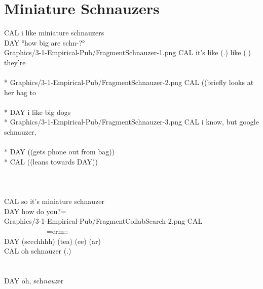 \section{Miniature Schnauzers}\label{app:fragments-pub schnauzers}
\begin{inlinefrag*} 
    \begin{transcript*}
        \by CAL {i like miniature schnauzers} \\
        \by DAY {°how big are schn-?°} \\
           {Graphics/3-1-Empirical-Pub/FragmentSchnauzer-1.png}
        \by CAL {it's like (.) like (.) they're} \\
         \\*
           {Graphics/3-1-Empirical-Pub/FragmentSchnauzer-2.png}
        \by CAL {((briefly looks at her bag to} \\
         \\*
        \by DAY {i like big dogs\vspace{1.9cm}} \\*
           {Graphics/3-1-Empirical-Pub/FragmentSchnauzer-3.png}
        \by CAL {i know, but google schnauzer,} \\
         \\*
        \by DAY {((gets phone out from bag))} \\*
        \by CAL {((leans towards DAY)) } \\
         \\
         \\
        \later  {\ldots} \\
        \by CAL {so it's miniature schnauzer} \\
        \by DAY {how do you?=} \\
           {Graphics/3-1-Empirical-Pub/FragmentCollabSearch-2.png}
        \by CAL {~~~~~~~~~~~~=erm::} \\
        \by DAY {(sccchhhh) (tea) (ee) (ar)} \\
        \by CAL {oh schnauzer (.)} \\
         \\
         \\
        \by DAY {oh, sch\emph{nauz}er\vspace*{.4cm}} \\

\end{transcript*}
\end{inlinefrag*}
